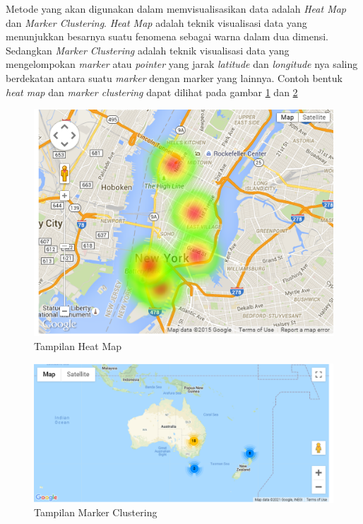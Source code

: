 Metode yang akan digunakan dalam memvisualisasikan data adalah \textit{Heat Map} dan \textit{Marker Clustering}. \textit{Heat Map} adalah teknik visualisasi data yang menunjukkan besarnya suatu fenomena sebagai warna dalam dua dimensi. Sedangkan \textit{Marker Clustering}  adalah teknik visualisasi data  yang  mengelompokan \textit{marker} atau \textit{pointer} yang jarak \textit{latitude} dan \textit{longitude} nya saling berdekatan antara suatu \textit{marker} dengan marker yang lainnya. Contoh bentuk \textit{heat map} dan \textit{marker clustering} dapat dilihat pada gambar \ref{fig:hm} dan \ref{fig:mc}
\begin{figure}[H]
	\centering
	\includegraphics[scale=0.5]{Gambar/heat-map-example.png}
	\caption{Tampilan Heat Map}
	\label{fig:hm}
\end{figure}

\begin{figure}[H]
	\centering
	\includegraphics[scale=0.3]{Gambar/markerclustering.PNG}
	\caption{Tampilan Marker Clustering}
	\label{fig:mc}
\end{figure}

